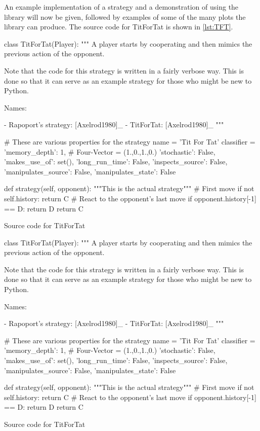An example implementation of a strategy and a demonstration of using the library will now be given, followed by examples of some of the many plots the library can produce.
The source code for TitForTat is shown in \ref{lst:TFT}.

\begin{listing}[htbp]
\begin{SourceCode}
class TitForTat(Player):
    """
    A player starts by cooperating and then mimics the previous action of the
    opponent.

    Note that the code for this strategy is written in a fairly verbose
    way. This is done so that it can serve as an example strategy for
    those who might be new to Python.

    Names:

    - Rapoport's strategy: [Axelrod1980]_
    - TitForTat: [Axelrod1980]_
    """

    # These are various properties for the strategy
    name = 'Tit For Tat'
    classifier = {
        'memory_depth': 1,  # Four-Vector = (1.,0.,1.,0.)
        'stochastic': False,
        'makes_use_of': set(),
        'long_run_time': False,
        'inspects_source': False,
        'manipulates_source': False,
        'manipulates_state': False
    }

    def strategy(self, opponent):
        """This is the actual strategy"""
        # First move
        if not self.history:
            return C
        # React to the opponent's last move
        if opponent.history[-1] == D:
            return D
        return C
\end{SourceCode}
\caption{Source code for TitForTat}
\label{lst:TFT}
\end{listing}

\begin{listing}[htbp]
\begin{ExampleCode}
class TitForTat(Player):
    """
    A player starts by cooperating and then mimics the previous action of the
    opponent.

    Note that the code for this strategy is written in a fairly verbose
    way. This is done so that it can serve as an example strategy for
    those who might be new to Python.

    Names:

    - Rapoport's strategy: [Axelrod1980]_
    - TitForTat: [Axelrod1980]_
    """

    # These are various properties for the strategy
    name = 'Tit For Tat'
    classifier = {
        'memory_depth': 1,  # Four-Vector = (1.,0.,1.,0.)
        'stochastic': False,
        'makes_use_of': set(),
        'long_run_time': False,
        'inspects_source': False,
        'manipulates_source': False,
        'manipulates_state': False
    }

    def strategy(self, opponent):
        """This is the actual strategy"""
        # First move
        if not self.history:
            return C
        # React to the opponent's last move
        if opponent.history[-1] == D:
            return D
        return C
\end{ExampleCode}
\caption{Source code for TitForTat}
\end{listing}

